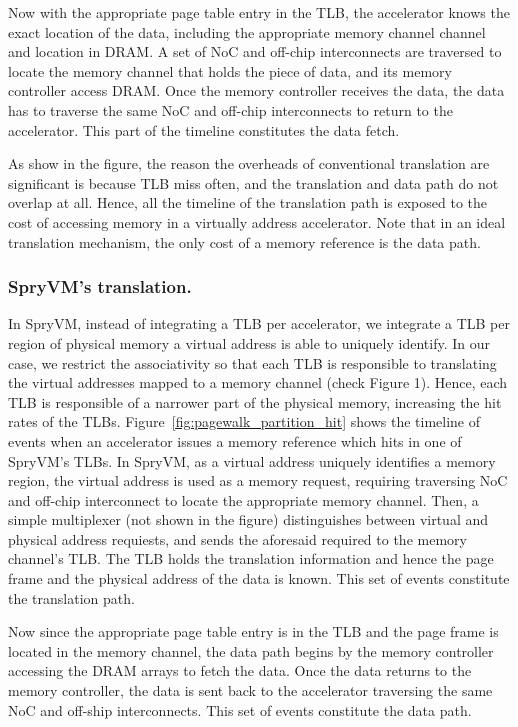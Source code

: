 Now with the appropriate page table entry in the TLB, the accelerator knows the exact location of the data, including the appropriate memory channel channel and location in DRAM. A set of NoC and off-chip interconnects are traversed to locate the memory channel that holds the piece of data, and its memory controller access DRAM. Once the memory controller receives the data, the data has to traverse the same NoC and off-chip interconnects to return to the accelerator. This part of the timeline constitutes the data fetch.

As show in the figure, the reason the overheads of conventional translation are significant is because TLB miss often, and the translation and data path do not overlap at all. Hence, all the timeline of the translation path is exposed to the cost of accessing memory in a virtually address accelerator. Note that in an ideal translation mechanism, the only cost of a memory reference is the data path.

\subsubsection{SpryVM's translation.}

In SpryVM, instead of integrating a TLB per accelerator, we integrate a TLB per region of physical memory a virtual address is able to uniquely identify. In our case, we restrict the associativity so that each TLB is responsible to translating the virtual addresses mapped to a memory channel (check Figure 1). Hence, each TLB is responsible of a narrower part of the physical memory, increasing the hit rates of the TLBs. Figure~\ref{fig:pagewalk_partition_hit} shows the timeline of events when an accelerator issues a memory reference which hits in one of SpryVM's TLBs. In SpryVM, as a virtual address uniquely identifies a memory region, the virtual address is used as a memory request, requiring traversing NoC and off-chip interconnect to locate the appropriate memory channel. Then, a simple multiplexer (not shown in the figure) distinguishes between virtual and physical address requiests, and sends the aforesaid required to the memory channel's TLB. The TLB holds the translation information and hence the page frame and the physical address of the data is known. This set of events constitute the translation path. 

Now since the appropriate page table entry is in the TLB and the page frame is located in the memory channel, the data path begins by the memory controller accessing the DRAM arrays to fetch the data. Once the data returns to the memory controller, the data is sent back to the accelerator traversing the same NoC and off-ship interconnects. This set of events constitute the data path.

